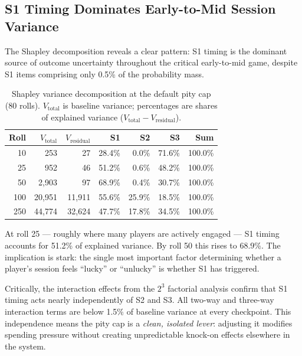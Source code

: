 \documentclass[11pt, a4paper]{article}
\begin{document}
\subsection{S1 Timing Dominates Early-to-Mid Session Variance}
\label{sec:results-variance}

The Shapley decomposition reveals a clear pattern: S1 timing is the
dominant source of outcome uncertainty throughout the critical
early-to-mid game, despite S1 items comprising only 0.5\% of the
probability mass.

\begin{table}[H]
\centering
\caption{Shapley variance decomposition at the default pity cap
(80 rolls). $V_{\text{total}}$ is baseline variance; percentages
are shares of explained variance
($V_{\text{total}} - V_{\text{residual}}$).}
\label{tab:shapley}
\begin{tabular}{r r r r r r r}
\toprule
Roll & $V_{\text{total}}$ & $V_{\text{residual}}$ & S1 & S2 & S3 & Sum \\
\midrule
10   & 253       & 27       & 28.4\% & 0.0\%  & 71.6\% & 100.0\% \\
25   & 952       & 46       & 51.2\% & 0.6\%  & 48.2\% & 100.0\% \\
50   & 2{,}903   & 97       & 68.9\% & 0.4\%  & 30.7\% & 100.0\% \\
100  & 20{,}951  & 11{,}911 & 55.6\% & 25.9\% & 18.5\% & 100.0\% \\
250  & 44{,}774  & 32{,}624 & 47.7\% & 17.8\% & 34.5\% & 100.0\% \\
\bottomrule
\end{tabular}
\end{table}

At roll 25 --- roughly where many players are actively engaged ---
S1 timing accounts for 51.2\% of explained variance. By roll 50 this
rises to 68.9\%. The implication is stark: the single most important
factor determining whether a player's session feels ``lucky'' or
``unlucky'' is whether S1 has triggered.

Critically, the interaction effects from the $2^3$ factorial
analysis confirm that S1 timing acts nearly independently of S2 and
S3. All two-way and three-way interaction terms are below 1.5\% of
baseline variance at every checkpoint. This independence means the
pity cap is a \emph{clean, isolated lever}: adjusting it modifies
spending pressure without creating unpredictable knock-on effects
elsewhere in the system.

\end{document}
